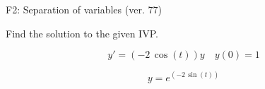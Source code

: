 \begin{exercise}
  \begin{exerciseTitle}F2: Separation of variables (ver. 77)\end{exerciseTitle}
  \begin{exerciseStatement}
    
Find the solution to the given IVP.

    
\[y'=( -2 \, \cos\left(t\right) )y\hspace{1em} y(0)= 1\]

  \end{exerciseStatement}
  \begin{exerciseAnswer}
    
\[y= e^{\left(-2 \, \sin\left(t\right)\right)}\]

  \end{exerciseAnswer}
\end{exercise}